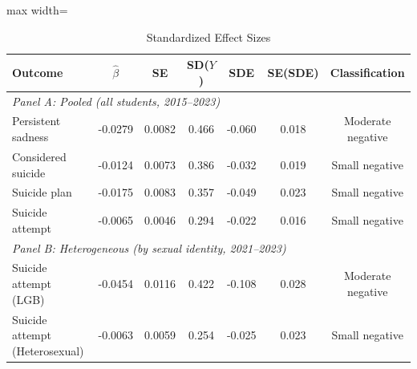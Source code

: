 \begin{table}[t]
\centering
\caption{Standardized Effect Sizes}
\label{tab:sde}
\begin{adjustbox}{max width=\textwidth}
\begin{tabular}{lcccccc}
\hline\hline
Outcome & $\hat{\beta}$ & SE & SD($Y$) & SDE & SE(SDE) & Classification \\
\hline
\multicolumn{7}{l}{\textit{Panel A: Pooled (all students, 2015--2023)}} \\[3pt]
Persistent sadness & -0.0279 & 0.0082 & 0.466 & -0.060 & 0.018 & Moderate negative \\
Considered suicide & -0.0124 & 0.0073 & 0.386 & -0.032 & 0.019 & Small negative \\
Suicide plan & -0.0175 & 0.0083 & 0.357 & -0.049 & 0.023 & Small negative \\
Suicide attempt & -0.0065 & 0.0046 & 0.294 & -0.022 & 0.016 & Small negative \\
\multicolumn{7}{l}{\textit{Panel B: Heterogeneous (by sexual identity, 2021--2023)}} \\[3pt]
Suicide attempt (LGB) & -0.0454 & 0.0116 & 0.422 & -0.108 & 0.028 & Moderate negative \\
Suicide attempt (Heterosexual) & -0.0063 & 0.0059 & 0.254 & -0.025 & 0.023 & Small negative \\
\hline\hline
\end{tabular}
\end{adjustbox}
\begin{itemize}[leftmargin=*,nosep]

\end{itemize}
\end{table}
